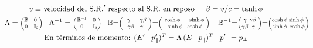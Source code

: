\begin{align*}
    &\hspace{10pt}
\text{$v\equiv$ velocidad del S.R.$'$ respecto al S.R. en reposo\;\;\;\; $\beta = v/c = \tanh \phi$}
   \\
&\hspace{-22pt}
\Lambda=
    \scalebox{0.75}{$    \begin{pmatrix} \mathbb{B} & 0\;\\ 
    0 & \mathbb{I}_2\\ 
   \end{pmatrix}$} \; \; \;
   \Lambda^{-1} = \scalebox{0.75}{$    \begin{pmatrix} \mathbb{B}^{-1} & 0\;\\
    0 & \mathbb{I}_2\\ 
   \end{pmatrix}$}\;\;\; 
    \mathbb{B} {=} \scalebox{0.75}{$\begin{pmatrix} \gamma \hspace{-5pt}\!& \!-\gamma \beta \; \\ 
    -\gamma\beta \hspace{-5pt}\!&\! \gamma \\ 
    \end{pmatrix}$}{=}\scalebox{0.75}{$\begin{pmatrix} \cosh \phi \hspace{-7pt}& -\sinh\phi \; \\ 
    -\sinh\phi \hspace{-7pt}& \cosh \phi \\ 
    \end{pmatrix}$}\; \;\;\;  \mathbb{B}^{-1} {=} \scalebox{0.75}{$\begin{pmatrix} \gamma \hspace{-5pt}\!& \!\gamma \beta \; \\ 
    \gamma\beta \hspace{-5pt}\!&\! \gamma \\ 
    \end{pmatrix}$}{=}\scalebox{0.75}{$\begin{pmatrix} \cosh \phi \hspace{-7pt}& \sinh\phi \; \\ 
    \sinh\phi \hspace{-7pt}& \cosh \phi \\ 
    \end{pmatrix}$}\;\;\; \\
    &
    \quad \qquad \text{En términos de momento: } ( E' \;\;\; p'_{\parallel})^T = \Lambda \, (E \;\;\; p_{\parallel})^T\;\;\; p'_{\perp} = p_{\perp}
\end{align*}



